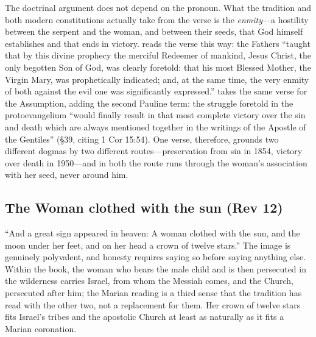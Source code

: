 The doctrinal argument does not depend on the pronoun. What the tradition
and both modern constitutions actually take from the verse is the
\emph{enmity}---a hostility between the serpent and the woman, and
between their seeds, that God himself establishes and that ends in
victory.  reads the verse this way: the Fathers
``taught that by this divine prophecy the merciful Redeemer of mankind,
Jesus Christ, the only begotten Son of God, was clearly foretold: that
his most Blessed Mother, the Virgin Mary, was prophetically indicated;
and, at the same time, the very enmity of both against the evil one was
significantly expressed.''
 takes the same verse for the Assumption,
adding the second Pauline term: the struggle foretold in the
protoevangelium ``would finally result in that most complete victory
over the sin and death which are always mentioned together in the
writings of the Apostle of the Gentiles'' (\S39, citing 1 Cor
15:54).
One verse, therefore, grounds two different dogmas by two different
routes---preservation from sin in 1854, victory over death in
1950---and in both the route runs through the woman's association with
her seed, never around him.

\subsection*{The Woman clothed with the sun (Rev 12)}

``And a great sign appeared in heaven: A woman clothed with the sun, and
the moon under her feet, and on her head a crown of twelve
stars.'' The image is genuinely
polyvalent, and honesty requires saying so before saying anything else.
Within the book, the woman who bears the male child and is then
persecuted in the wilderness carries Israel, from whom the Messiah
comes, and the Church, persecuted after him; the Marian reading is a
third sense that the tradition has read with the other two, not a
replacement for them. Her crown of twelve stars fits Israel's tribes and
the apostolic Church at least as naturally as it fits a Marian
coronation.

